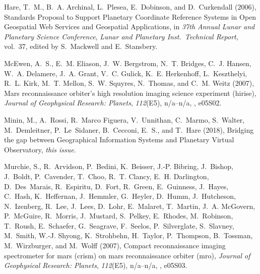\begin{thebibliography}{22}
{Hare}, T.~M., B.~A. {Archinal}, L.~{Plesea}, E.~{Dobinson}, and
  D.~{Curkendall} (2006), {Standards Proposal to Support Planetary Coordinate
  Reference Systems in Open Geospatial Web Services and Geospatial
  Applications}, in \textit{37th Annual Lunar and Planetary Science
  Conference}, \textit{Lunar and Planetary Inst.~Technical Report}, vol.~37,
  edited by S.~{Mackwell} and E.~{Stansbery}.

McEwen, A.~S., E.~M. Eliason, J.~W. Bergstrom, N.~T. Bridges, C.~J. Hansen,
  W.~A. Delamere, J.~A. Grant, V.~C. Gulick, K.~E. Herkenhoff, L.~Keszthelyi,
  R.~L. Kirk, M.~T. Mellon, S.~W. Squyres, N.~Thomas, and C.~M. Weitz (2007),
  Mars reconnaissance orbiter's high resolution imaging science experiment
  (hirise), \textit{Journal of Geophysical Research: Planets},
  \textit{112}(E5), n/a--n/a, , e05S02.

{Minin}, M., A.~{Rossi}, R.~{Marco Figuera}, V.~{Unnithan}, C.~Marmo,
  S.~Walter, M.~Demleitner, P.~Le~Sidaner, B.~Cecconi, E.~S., and T.~Hare
  (2018), {Bridging the gap between Geographical Information Systems and
  Planetary Virtual Observatory}, \textit{this issue}.

Murchie, S., R.~Arvidson, P.~Bedini, K.~Beisser, J.-P. Bibring, J.~Bishop,
  J.~Boldt, P.~Cavender, T.~Choo, R.~T. Clancy, E.~H. Darlington,
  D.~Des~Marais, R.~Espiritu, D.~Fort, R.~Green, E.~Guinness, J.~Hayes,
  C.~Hash, K.~Heffernan, J.~Hemmler, G.~Heyler, D.~Humm, J.~Hutcheson,
  N.~Izenberg, R.~Lee, J.~Lees, D.~Lohr, E.~Malaret, T.~Martin, J.~A. McGovern,
  P.~McGuire, R.~Morris, J.~Mustard, S.~Pelkey, E.~Rhodes, M.~Robinson,
  T.~Roush, E.~Schaefer, G.~Seagrave, F.~Seelos, P.~Silverglate, S.~Slavney,
  M.~Smith, W.-J. Shyong, K.~Strohbehn, H.~Taylor, P.~Thompson, B.~Tossman,
  M.~Wirzburger, and M.~Wolff (2007), Compact reconnaissance imaging
  spectrometer for mars (crism) on mars reconnaissance orbiter (mro),
  \textit{Journal of Geophysical Research: Planets}, \textit{112}(E5),
  n/a--n/a, , e05S03.


\end{thebibliography}
